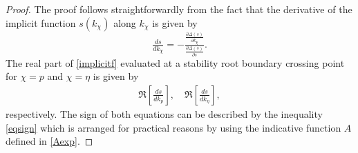 \documentclass[twoside,reqno,11pt]{fcaa-var} %
\begin{document}
\begin{proof}
	The proof follows straightforwardly from the fact that the derivative of the implicit function $s(k_\chi)$ along $k_\chi$ is given by
	\begin{equation}
	\tfrac{ds}{dk_\chi}=-\tfrac{\frac{\partial \Delta(s)}{\partial k_\chi}}{\frac{\partial\Delta(s)}{\partial s}}. \label{implicitf}
	\end{equation}
The real part of \eqref{implicitf} evaluated at a stability root boundary crossing point for $\chi=p$ and $\chi=\eta$ is given by
	\begin{eqnarray}
	\Re\left[\tfrac{ds}{dk_p}\right], \quad
	\Re\left[\tfrac{ds}{dk_\eta}\right],
	\end{eqnarray}
	respectively. The sign of both equations can be described by the inequality \eqref{eqsign} which is arranged for practical reasons by using the indicative function $A$ defined in \eqref{Aexp}.
\end{proof}
\end{document}

